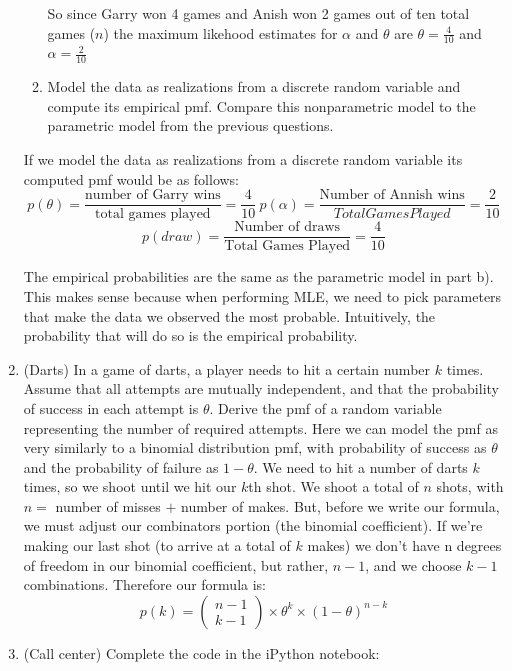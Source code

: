\documentclass[12pt,twoside]{article}
\begin{document}
\begin{enumerate}
\begin{enumerate}
So since Garry won 4 games and Anish won 2 games out of ten total games ($n$) the maximum likehood estimates for $\alpha$ and $\theta$ are $\theta = \frac{4}{10}$ and $\alpha = \frac{2}{10}$

\item Model the data as realizations from a discrete random variable and compute its empirical pmf. Compare this nonparametric model to the parametric model from the previous questions.  
\end{enumerate}
\subitem
If we model the data as realizations from a discrete random variable its computed pmf would be as follows: $$
    p(\theta) = \frac{\text{number of Garry wins}}{\text{total games played}} = \frac{4}{10} \  p(\alpha) = \frac{\text{Number of Annish wins}}{Total Games Played} = \frac{2}{10}$$
    $$
    p(draw) = \frac{\text{Number of draws}}{\text{Total Games Played}} = \frac{4}{10}
$$

The empirical probabilities are the same as the parametric model in part b). This makes sense because when performing MLE, we need to pick parameters that make the data we observed the most probable. Intuitively, the probability that will do so is the empirical probability. 

\item (Darts) In a game of darts, a player needs to hit a certain number $k$ times. Assume that all attempts are mutually independent, and that the probability of success in each attempt is $\theta$. Derive the pmf of a random variable representing the number of required attempts.
\subitem
Here we can model the pmf as very similarly to a binomial distribution pmf, with probability of success as $\theta$ and the probability of failure as $1-\theta$. We need to hit a number of darts $k$ times, so we shoot until we hit our $k$th shot. We shoot a total of $n$ shots, with $n=$ number of misses $+$ number of makes. But, before we write our formula, we must adjust our combinators portion (the binomial coefficient). If we're making our last shot (to arrive at a total of $k$ makes) we don't have n degrees of freedom in our binomial coefficient, but rather, $n-1$, and we choose $k-1$ combinations. Therefore our formula is: 
$$
    p(k)    =  \begin{pmatrix}
    n-1 \\
    k-1
    \end{pmatrix} \times \theta ^k \times (1-\theta)^{n-k}
$$

\break 
\item (Call center)
Complete the code in the iPython notebook: 


\end{enumerate}
\end{document}
